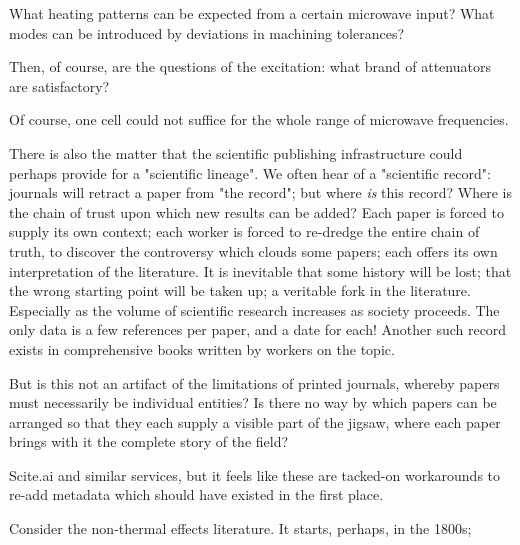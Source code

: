 \documentclass[paper.tex]{subfiles}
\begin{document}
What heating patterns can be expected from a certain microwave input? What modes can be introduced by deviations in machining tolerances?

Then, of course, are the questions of the excitation: what brand of attenuators are satisfactory?

Of course, one cell could not suffice for the whole range of microwave frequencies.


There is also the matter that the scientific publishing infrastructure could perhaps provide for a "scientific lineage". We often hear of a "scientific record": journals will retract a paper from "the record"; but where {\it is} this record? Where is the chain of trust upon which new results can be added? Each paper is forced to supply its own context; each worker is forced to re-dredge the entire chain of truth, to discover the controversy which clouds some papers; each offers its own interpretation of the literature. It is inevitable that some history will be lost; that the wrong starting point will be taken up; a veritable fork in the literature. Especially as the volume of scientific research increases as society proceeds. The only data is a few references per paper, and a date for each! Another such record exists in comprehensive books written by workers on the topic.

But is this not an artifact of the limitations of printed journals, whereby papers must necessarily be individual entities? Is there no way by which papers can be arranged so that they each supply a visible part of the jigsaw, where each paper brings with it the complete story of the field?

Scite.ai and similar services, but it feels like these are tacked-on workarounds to re-add metadata which should have existed in the first place.

Consider the non-thermal effects literature. It starts, perhaps, in the 1800s; 
\end{document}
